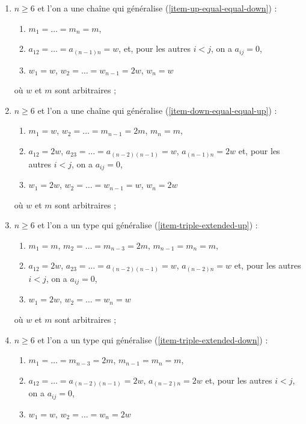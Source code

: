 \begin{lemma}[Genre un]
\begin{enumerate}
\begin{enumerate}
\end{enumerate}
où $w$ et $m$ sont arbitraires ;
\item
\label{item-up-chain-equal-down}
$n \geq 6$ et l'on a une chaîne qui généralise (\ref{item-up-equal-equal-down}) :
\begin{enumerate}
\item $m_1 = \ldots = m_n = m$,
\item $a_{12} = \ldots = a_{(n - 1) n} = w$,
et, pour les autres $i < j$, on a $a_{ij} = 0$,
\item $w_1 = w$, $w_2 = \ldots = w_{n - 1} = 2w$, $w_n = w$
\end{enumerate}
où $w$ et $m$ sont arbitraires ;
\item
\label{item-down-chain-equal-up}
$n \geq 6$ et l'on a une chaîne qui généralise (\ref{item-down-equal-equal-up}) :
\begin{enumerate}
\item $m_1 = w$, $w_2 = \ldots = m_{n - 1} = 2m$, $m_n = m$,
\item $a_{12} = 2w$, $a_{23} = \ldots = a_{(n - 2) (n - 1)} = w$,
$a_{(n - 1) n} = 2w$ et, pour les autres $i < j$, on a $a_{ij} = 0$,
\item $w_1 = 2w$, $w_2 = \ldots = w_{n - 1} = w$, $w_n = 2w$
\end{enumerate}
où $w$ et $m$ sont arbitraires ;
\item
\label{item-Dn-extended-up}
$n \geq 6$ et l'on a un type qui généralise (\ref{item-triple-extended-up}) :
\begin{enumerate}
\item $m_1 = m$, $m_2 = \ldots = m_{n - 3} = 2m$, $m_{n - 1} = m_n = m$,
\item $a_{12} = 2w$, $a_{23} = \ldots = a_{(n - 2) (n - 1)} = w$,
$a_{(n - 2) n} = w$ et, pour les autres $i < j$, on a $a_{ij} = 0$,
\item $w_1 = 2w$, $w_2 = \ldots = w_n = w$
\end{enumerate}
où $w$ et $m$ sont arbitraires ;
\item
\label{item-Dn-extended-down}
$n \geq 6$ et l'on a un type qui généralise (\ref{item-triple-extended-down}) :
\begin{enumerate}
\item $m_1 = \ldots = m_{n - 3} = 2m$, $m_{n - 1} = m_n = m$,
\item $a_{12} = \ldots = a_{(n - 2) (n - 1)} = 2w$,
$a_{(n - 2) n} = 2w$ et, pour les autres $i < j$, on a $a_{ij} = 0$,
\item $w_1 = w$, $w_2 = \ldots = w_n = 2w$

\end{enumerate}
\end{enumerate}
\end{lemma}
